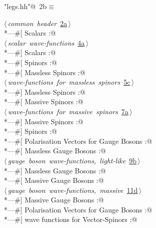 \documentclass[a4paper,12pt]{amsart}
\renewcommand{\NWtarget}[2]{\hypertarget{#1}{#2}}
\renewcommand{\NWlink}[2]{\hyperlink{#1}{#2}}
\begin{document}
\begin{flushleft} \small\label{scrap2}\raggedright\small
\NWtarget{nuweb2b}{} \verb@"legs.hh"@\nobreak\ {\footnotesize {2b}}$\equiv$
\vspace{-1ex}
\begin{list}{}{} \item
\mbox{}\verb@@\hbox{$\langle\,${\itshape common header}\nobreak\ {\footnotesize \NWlink{nuweb2a}{2a}}$\,\rangle$}\verb@@\\
\mbox{}\verb@*---#[ Scalars :@\\
\mbox{}\verb@@\hbox{$\langle\,${\itshape scalar wave-functions}\nobreak\ {\footnotesize \NWlink{nuweb4a}{4a}}$\,\rangle$}\verb@@\\
\mbox{}\verb@*---#] Scalars :@\\
\mbox{}\verb@*---#[ Spinors :@\\
\mbox{}\verb@*---#[   Massless Spinors :@\\
\mbox{}\verb@@\hbox{$\langle\,${\itshape wave-functions for massless spinors}\nobreak\ {\footnotesize \NWlink{nuweb5c}{5c}}$\,\rangle$}\verb@@\\
\mbox{}\verb@*---#]   Massless Spinors :@\\
\mbox{}\verb@*---#[   Massive Spinors :@\\
\mbox{}\verb@@\hbox{$\langle\,${\itshape wave-functions for massive spinors}\nobreak\ {\footnotesize \NWlink{nuweb7a}{7a}}$\,\rangle$}\verb@@\\
\mbox{}\verb@*---#]   Massive Spinors :@\\
\mbox{}\verb@*---#] Spinors :@\\
\mbox{}\verb@*---#[ Polarisation Vectors for Gauge Bosons :@\\
\mbox{}\verb@*---#[    Massless Gauge Bosons :@\\
\mbox{}\verb@@\hbox{$\langle\,${\itshape gauge boson wave-functions, light-like}\nobreak\ {\footnotesize \NWlink{nuweb9b}{9b}}$\,\rangle$}\verb@@\\
\mbox{}\verb@*---#]    Massless Gauge Bosons :@\\
\mbox{}\verb@*---#[    Massive Gauge Bosons :@\\
\mbox{}\verb@@\hbox{$\langle\,${\itshape gauge boson wave-functions, massive}\nobreak\ {\footnotesize \NWlink{nuweb11d}{11d}}$\,\rangle$}\verb@@\\
\mbox{}\verb@*---#]    Massive Gauge Bosons :@\\
\mbox{}\verb@*---#] Polarisation Vectors for Gauge Bosons :@\\
\mbox{}\verb@*---#[ wave functions for Vector-Spinors :@\\

\end{list}
\end{flushleft}
\end{document}
